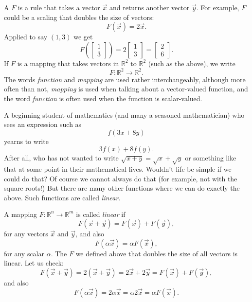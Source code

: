 A \emph{}
$F$ is a rule that takes a vector $\vec{x}$ and returns another vector
$\vec{y}$.  For example, $F$ could be a scaling that doubles the size of
vectors:
\begin{equation*}
F(\vec{x}) = 2 \vec{x} .
\end{equation*}
Applied to say $(1,3)$ we get
\begin{equation*}
F
\left( \begin{bmatrix} 1 \\ 3 \end{bmatrix} \right)
=
2
\begin{bmatrix} 1 \\ 3 \end{bmatrix}
=
\begin{bmatrix} 2 \\ 6 \end{bmatrix} .
\end{equation*}
If $F$ is a mapping that takes vectors in
${\mathbb R}^2$ to 
${\mathbb R}^2$ (such as the above), we write
\begin{equation*}
F \colon {\mathbb R}^2 \to {\mathbb R}^2 .
\end{equation*}
The words \emph{function} and \emph{mapping} are used rather interchangeably,
although more often than not, \emph{mapping} is used when talking about a
vector-valued function, and the word \emph{function} is often used when the
function is scalar-valued.

A beginning student of mathematics (and many a seasoned mathematician)
who sees an expression such as
\begin{equation*}
f(3x+8y)
\end{equation*}
yearns to write
\begin{equation*}
3f(x)+8f(y) .
\end{equation*}
After all, who has not wanted to write $\sqrt{x+y} = \sqrt{x} + \sqrt{y}$ or
something like that at some point in their mathematical lives.
Wouldn't life be simple if we could do that?
Of course we cannot always do that (for example, not with the square roots!)
But there are many other functions where
we can do exactly the above.  Such functions are called \emph{linear}.

A mapping $F \colon {\mathbb R}^n \to {\mathbb R}^m$
is called \emph{linear} if
\begin{equation*}
F(\vec{x}+\vec{y}) = F(\vec{x})+F(\vec{y}),
\end{equation*}
for any vectors $\vec{x}$ and $\vec{y}$,
and also
\begin{equation*}
F(\alpha \vec{x}) = \alpha F(\vec{x}) ,
\end{equation*}
for any scalar $\alpha$.
The $F$ we defined above that doubles the size of all vectors is linear.  Let
us check:
\begin{equation*}
F(\vec{x}+\vec{y})
=
2(\vec{x}+\vec{y})
=
2\vec{x}+2\vec{y}
=
F(\vec{x})+F(\vec{y}) ,
\end{equation*}
and also
\begin{equation*}
F(\alpha \vec{x}) = 2 \alpha \vec{x} = \alpha 2 \vec{x} = \alpha F(\vec{x}) .
\end{equation*}


